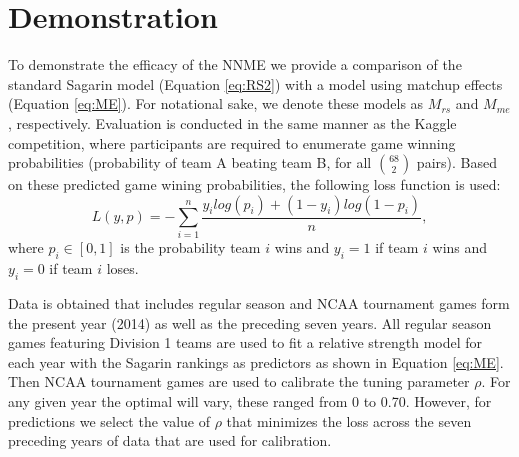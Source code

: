 \documentclass[letterpaper,12pt]{article}
\begin{document}
\section{Demonstration}
To demonstrate the efficacy of the NNME we provide a comparison of the standard Sagarin model (Equation \ref{eq:RS2}) with a model using matchup effects (Equation \ref{eq:ME}). For notational sake, we denote these models as $M_{rs}$ and $M_{me}$, respectively. Evaluation is conducted in the same manner as the Kaggle competition, where participants are required to enumerate game winning probabilities (probability of team A beating team B, for all $68 \choose 2$ pairs). Based on these predicted game wining probabilities, the following loss function is used:
\begin{equation}\label{eq:kaggle_score}
L(y,p)=-\sum_{i=1}^n\frac{y_ilog(p_i)+ (1-y_i)log(1-p_i)}{n},
\end{equation}
where $p_i\in[0,1]$ is the probability team $i$ wins and $y_i=1$ if team $i$ wins and $y_i = 0$ if team $i$ loses.

Data is obtained that includes regular season and NCAA tournament games form the present year (2014) as well as the preceding seven years. All regular season games featuring Division 1 teams are used to fit a relative strength model for each year with the Sagarin rankings as predictors as shown in Equation \ref{eq:ME}. Then NCAA tournament games are used to calibrate the tuning parameter $\rho$. For any given year the optimal will vary, these ranged from 0 to 0.70. However, for predictions we select the value of $\rho$ that minimizes the loss across the seven preceding years of data that are used for calibration.
\end{document}

